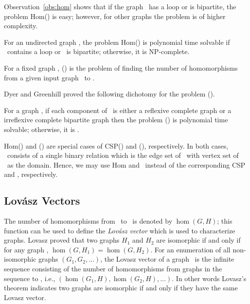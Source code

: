 Observation~\ref{obs:hom} shows that if the graph \mH\ has a loop or is bipartite,
the problem Hom(\mH) is easy; however, for other graphs the problem is of higher complexity.

\begin{theorem} 
For an undirected graph \mH, the problem Hom(\mH) is polynomial time solvable if 
\mH\ contains a loop or \mH\ is bipartite; otherwise, it is NP-complete.
\end{theorem}

\begin{defi}[\chom(\mH)]
For a fixed graph \mH,
\chom(\mH) is the problem of finding the number of homomorphisms from a given 
input graph \mG\ to \mH.
\end{defi}

Dyer and Greenhill proved the following dichotomy for the problem \chom(\mH)\@.
\begin{theorem} 
For a graph \mH, if each component of \mH\ is either a reflexive complete graph
or a irreflexive complete bipartite graph then the problem \chom(\mH)
is polynomial time solvable; otherwise, it is \cpc\@.
\end{theorem}

Hom(\mH) and \chom(\mH) are special cases of CSP(\mrelset) and \ccsp(\mrelset),
respectively. In both cases, \mrelset\ consists of a single binary relation which is the
edge set of \mH\ with vertex set of \mH\ as the domain.
Hence, we may use Hom and \chom\ instead of
the corresponding CSP and \ccsp, respectively. 

\subsection*{Lov\'{a}sz Vectors}
The number of homomorphisms from \mG\ to \mH\ is denoted by \(\hom(G,H)\); this function
can be used to define the \emph{Lov\'{a}sz vector} which is used to characterize graphs.
Lovasz \cite{lovasz} proved that
two graphs \(H_1\) and \(H_2\) are isomorphic if and only if for any graph \mG,
\(\hom(G,H_1)=\hom(G,H_2)\). 
For an enumeration of all non-isomorphic graphs \((G_1,G_2,\dotsc)\), 
the Lovasz vector of a graph \mH\ is the infinite sequence consisting of the number of
homomorphisms from graphs in the sequence to \mH, i.e.,
\((\hom(G_1,H), \hom(G_2,H), \dotsc)\)\@. 
In other words Lovasz's theorem indicates two graphs are isomorphic if and only if
they have the same Lovasz vector.  
\begin{comment}
Lov\'{a}sz and et al. \cite{propertytesting} used the Lov\'{a}sz vector
for \emph{Edge Reconstruction} problem over graphs with sufficiently many edges, 
They also used Lov\'{a}sz vector in the {\em Property Testing} area.
In this model there is usually a huge graph and at each step only small sample of vertices
can be examined. The goal is to infer parameters of the graph using small samples of it. 
A good example of such a graph one might want to find the properties is the Internet.
\end{comment}

